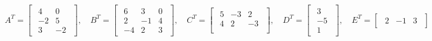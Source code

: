 \documentclass{article}
\begin{document}
\begin{equation*}
    A^T = \begin{bmatrix}
        \begin{array}{rrr}
            4 & 0 \\ 
            -2 & 5 \\
            3 & -2
        \end{array}
    \end{bmatrix}
    , \quad B^T = \begin{bmatrix}
        \begin{array}{rrr}
            6 & 3 & 0\\ 
            2 & -1 & 4\\
            -4 & 2 & 3
        \end{array}
    \end{bmatrix}
    , \quad C^T = \begin{bmatrix}
        \begin{array}{rrr}
            5 & -3 & 2\\ 
            4 & 2 & -3\\
        \end{array}
    \end{bmatrix}
    , \quad D^T = \begin{bmatrix}
        \begin{array}{r}
            3 \\
            -5\\ 
            1
        \end{array}
    \end{bmatrix}
    , \quad E^T = \begin{bmatrix}
        \begin{array}{rrr}
            2 & -1 & 3
        \end{array}
    \end{bmatrix}
\end{equation*}

\cite{kolman}
\pagebreak

\end{document}
